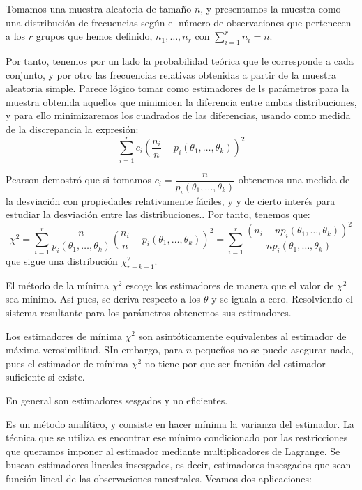 Tomamos una muestra aleatoria de tama\~no $n$, y presentamos la muestra como una distribuci\'on de frecuencias seg\'un el n\'umero de observaciones que pertenecen a los $r$ grupos que hemos definido, $n_1,\ldots,n_r$ con $\sum_{i=1}^rn_i=n$.

Por tanto, tenemos por un lado la probabilidad te\'orica que le corresponde a cada conjunto, y por otro las frecuencias relativas obtenidas a partir de la muestra aleatoria simple. Parece l\'ogico tomar como estimadores de ls par\'ametros para la muestra obtenida aquellos que minimicen la diferencia entre ambas distribuciones, y para ello minimizaremos los cuadrados de las diferencias, usando como medida de la discrepancia la expresi\'on:
\begin{equation*}
\sum_{i=1}^rc_i\left(\dfrac{n_i}{n}-p_i(\theta_1,\ldots,\theta_k)\right)^2
\end{equation*}

Pearson demostr\'o que si tomamos $c_i=\dfrac{n}{p_i(\theta_1,\ldots,\theta_k)}$ obtenemos una medida de la desviaci\'on con propiedades relativamente f\'aciles, y y de cierto inter\'es para estudiar la desviaci\'on entre las distribuciones.. Por tanto, tenemos que:
\begin{equation*}
\chi^2=\sum_{i=1}^r\dfrac{n}{p_i(\theta_1,\ldots,\theta_k)}\left(\dfrac{n_i}{n}-p_i(\theta_1,\ldots,\theta_k)\right)^2=\sum_{i=1}^r\dfrac{\left(n_i-np_i(\theta_1,\ldots,\theta_k)\right)^2}{np_i(\theta_1,\ldots,\theta_k)}
\end{equation*}
que sigue una distribuci\'on $\chi_{r-k-1}^2$.

El m\'etodo de la m\'inima $\chi^2$ escoge los estimadores de manera que el valor de $\chi^2$ sea m\'inimo. As\'i pues, se deriva respecto a los $\theta$ y se iguala a cero. Resolviendo el sistema resultante para los par\'ametros obtenemos sus estimadores.

Los estimadores de m\'inima $\chi^2$ son asint\'oticamente equivalentes al estimador de m\'axima verosimilitud. SIn embargo, para $n$ peque\~nos no se puede asegurar nada, pues el estimador de m\'inima $\chi^2$ no tiene por que ser fucni\'on del estimador suficiente si existe.

En general son estimadores sesgados y no eficientes.

Es un m\'etodo anal\'itico, y consiste en hacer m\'inima la varianza del estimador. La t\'ecnica que se utiliza es encontrar ese m\'inimo condicionado por las restricciones que queramos imponer al estimador mediante multiplicadores de Lagrange. Se buscan estimadores lineales insesgados, es decir, estimadores insesgados que sean funci\'on lineal de las observaciones muestrales. Veamos dos aplicaciones:

